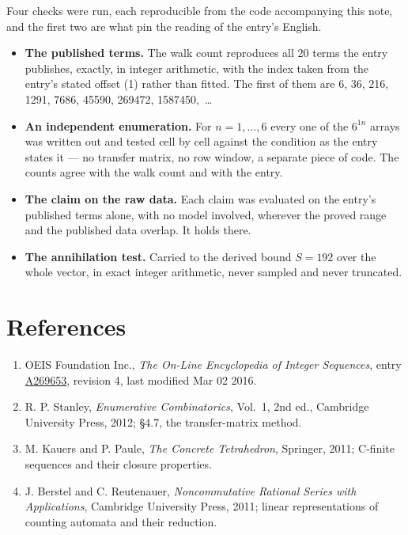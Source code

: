 \documentclass[11pt]{article}
\theoremstyle{definition}
\begin{document}
Four checks were run, each reproducible from the code accompanying this note, and the first two are what pin the reading of the entry's English.

\begin{itemize}

\item {\bfseries The published terms.} The walk count reproduces all 20 terms the entry publishes, exactly, in integer arithmetic, with the index taken from the entry's stated offset (1) rather than fitted. The first of them are 6, 36, 216, 1291, 7686, 45590, 269472, 1587450,~\dots

\item {\bfseries An independent enumeration.} For $n = 1,\dots,6$ every one of the $6^{1n}$ arrays was written out and tested cell by cell against the condition as the entry states it --- no transfer matrix, no row window, a separate piece of code. The counts agree with the walk count and with the entry.

\item {\bfseries The claim on the raw data.} Each claim was evaluated on the entry's published terms alone, with no model involved, wherever the proved range and the published data overlap. It holds there.

\item {\bfseries The annihilation test.} Carried to the derived bound $S = 192$ over the whole vector, in exact integer arithmetic, never sampled and never truncated.

\end{itemize}

\section{References}

\begin{enumerate}

\item OEIS Foundation Inc., \emph{The On-Line Encyclopedia of Integer Sequences}, entry \href{https://oeis.org/A269653}{A269653}, revision 4, last modified Mar 02 2016.

\item R. P. Stanley, \emph{Enumerative Combinatorics}, Vol.~1, 2nd ed., Cambridge University Press, 2012; \S4.7, the transfer-matrix method.

\item M. Kauers and P. Paule, \emph{The Concrete Tetrahedron}, Springer, 2011; C-finite sequences and their closure properties.

\item J. Berstel and C. Reutenauer, \emph{Noncommutative Rational Series with Applications}, Cambridge University Press, 2011; linear representations of counting automata and their reduction.

\end{enumerate}
\end{document}
